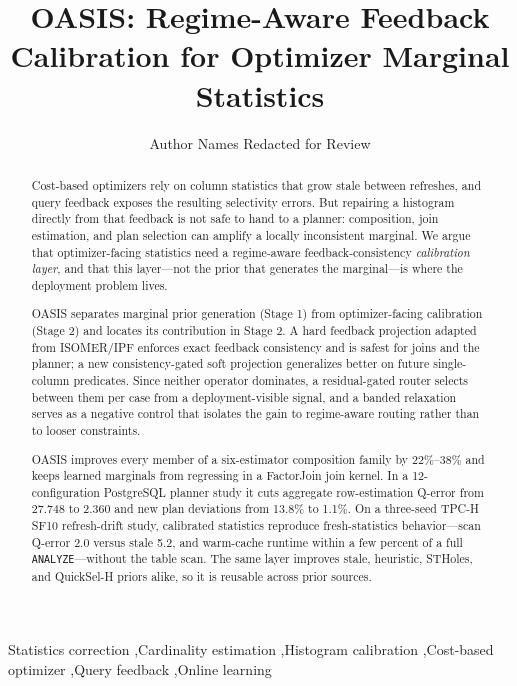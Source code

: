 \documentclass[preprint,12pt]{elsarticle}
\begin{document}
\begin{frontmatter}

\title{OASIS: Regime-Aware Feedback Calibration for Optimizer Marginal Statistics}

\author[inst1]{Author Names Redacted for Review}
\address[inst1]{Affiliation Redacted for Review}

\begin{abstract}
Cost-based optimizers rely on column statistics that grow stale between
refreshes, and query feedback exposes the resulting selectivity errors. But
repairing a histogram directly from that feedback is not safe to hand to a
planner: composition, join estimation, and plan selection can amplify a locally
inconsistent marginal. We argue that optimizer-facing statistics need a
regime-aware feedback-consistency \emph{calibration layer}, and that this
layer---not the prior that generates the marginal---is where the deployment
problem lives.

OASIS separates marginal prior generation (Stage 1) from optimizer-facing
calibration (Stage 2) and locates its contribution in Stage 2. A hard feedback
projection adapted from ISOMER/IPF enforces exact feedback consistency and is
safest for joins and the planner; a new consistency-gated soft projection
generalizes better on future single-column predicates. Since neither operator
dominates, a residual-gated router selects between them per case from a
deployment-visible signal, and a banded relaxation serves as a negative control
that isolates the gain to regime-aware routing rather than to looser constraints.

OASIS improves every member of a six-estimator composition family by 22\%--38\%
and keeps learned marginals from regressing in a FactorJoin join kernel. In a
12-configuration PostgreSQL planner study it cuts aggregate row-estimation
Q-error from 27.748 to 2.360 and new plan deviations from 13.8\% to 1.1\%. On a
three-seed TPC-H SF10 refresh-drift study, calibrated statistics reproduce
fresh-statistics behavior---scan Q-error 2.0 versus stale 5.2, and warm-cache
runtime within a few percent of a full \texttt{ANALYZE}---without the table scan.
The same layer improves stale, heuristic, STHoles, and QuickSel-H priors alike,
so it is reusable across prior sources.
\end{abstract}

\begin{keyword}
Statistics correction \sep Cardinality estimation \sep Histogram calibration
\sep Cost-based optimizer \sep Query feedback \sep Online learning
\end{keyword}

\end{frontmatter}
\end{document}
